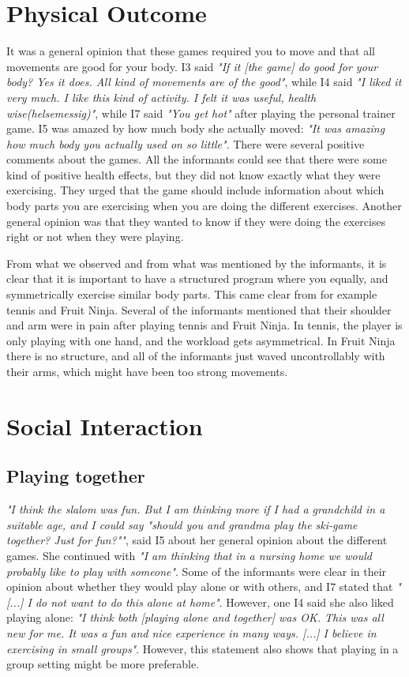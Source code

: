 \section{Physical Outcome}

It was a general opinion that these games required you to move and that all movements are good for your body. I3 said \emph{"If it [the game] do good for your body? Yes it does. All kind of movements are of the good"}, while I4 said  \emph{"I liked it very much. I like this kind of activity. I felt it was useful, health wise(helsemessig)"}, while I7 said \emph{"You get hot"} after playing the personal trainer game. I5 was amazed by how much body she actually moved: \emph{"It was amazing how much body you actually used on so little"}. There were several positive comments about the games. All the informants could see that there were some kind of positive health effects, but they did not know exactly what they were exercising. They urged that the game should include information about which body parts you are exercising when you are doing the different exercises. Another general opinion was that they wanted to know if they were doing the exercises right or not when they were playing. 

From what we observed and from what was mentioned by the informants, it is clear that it is important to have a structured program where you equally, and symmetrically exercise similar body parts. This came clear from for example tennis and Fruit Ninja. Several of the informants mentioned that their shoulder and arm were in pain after playing tennis and Fruit Ninja. In tennis, the player is only playing with one hand, and the workload gets asymmetrical. In Fruit Ninja there is no structure, and all of the informants just waved uncontrollably with their arms, which might have been too strong movements.
    
\section{Social Interaction}
\subsection{Playing together}
\emph{"I think the slalom was fun. But I am thinking more if I had a grandchild in a suitable age, and I could say "should you and grandma play the ski-game together? Just for fun?""}, said I5 about her general opinion about the different games. She continued with \emph{"I am thinking that in a nursing home we would probably like to play with someone"}. Some of the informants were clear in their opinion about whether they would play alone or with others, and I7 stated that \emph{"[...] I do not want to do this alone at home"}. However, one I4 said she also liked playing alone: \emph{"I think both [playing alone and together] was OK. This was all new for me. It was a fun and nice experience in many ways. [...] I believe in  exercising in small groups"}. However, this statement also shows that playing in a group setting might be more preferable.  


